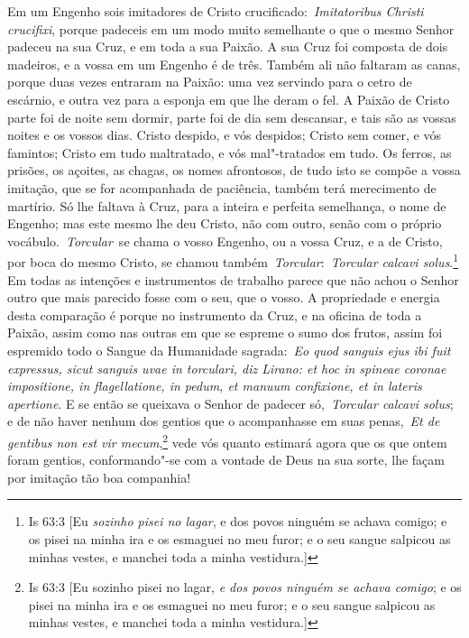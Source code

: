 Em um Engenho sois imitadores de Cristo
crucificado:~\emph{Imitatoribus Christi crucifixi}, porque padeceis em
um modo muito semelhante o que o mesmo Senhor padeceu na sua Cruz, e em
toda a sua Paixão. A sua Cruz foi composta de dois madeiros, e a vossa
em um Engenho é de três. Também ali não faltaram as canas, porque duas
vezes entraram na Paixão: uma vez servindo para o cetro de escárnio, e
outra vez para a esponja em que lhe deram o fel. A Paixão de Cristo
parte foi de noite sem dormir, parte foi de dia sem descansar, e tais
são as vossas noites e os vossos dias. Cristo despido, e vós despidos;
Cristo sem comer, e vós famintos; Cristo em tudo maltratado, e vós
mal"-tratados em tudo. Os ferros, as prisões, os açoites, as chagas, os
nomes afrontosos, de tudo isto se compõe a vossa imitação, que se for
acompanhada de paciência, também terá merecimento de martírio. Só lhe
faltava à Cruz, para a inteira e perfeita semelhança, o nome de Engenho;
mas este mesmo lhe deu Cristo, não com outro, senão com o próprio
vocábulo.~\emph{Torcular}~se chama o vosso Engenho, ou a vossa Cruz, e a
de Cristo, por boca do mesmo Cristo, se chamou
também~\emph{Torcular}:~\emph{Torcular calcavi solus}.\footnote{Is 63:3 [Eu \textit{sozinho pisei no lagar}, e dos povos ninguém se achava comigo; e os pisei na minha ira
e os esmaguei no meu furor; e o seu sangue salpicou as minhas vestes, e manchei toda a minha
vestidura.]}
Em todas as intenções e instrumentos de trabalho parece que não achou o
Senhor outro que mais parecido fosse com o seu, que o vosso. A
propriedade e energia desta comparação é porque no instrumento da Cruz,
e na oficina de toda a Paixão, assim como nas outras em que se espreme o
sumo dos frutos, assim foi espremido todo o Sangue da Humanidade
sagrada:~\emph{Eo quod sanguis ejus ibi fuit expressus, sicut sanguis
uvae in torculari, diz Lirano: et hoc in spineae coronae impositione, in
flagellatione, in pedum, et manuum confixione, et in lateris apertione}.
E se então se queixava o Senhor de padecer só,~\emph{Torcular calcavi
solus}; e de não haver nenhum dos gentios que o acompanhasse em suas
penas,~\emph{Et de gentibus non est vir mecum},\footnote{Is 63:3 [Eu sozinho pisei no lagar, \textit{e dos povos ninguém se achava comigo}; e os pisei na minha ira
e os esmaguei no meu furor; e o seu sangue salpicou as minhas vestes, e manchei toda a minha
vestidura.]} vede
vós quanto estimará agora que os que ontem foram gentios, conformando"-se
com a vontade de Deus na sua sorte, lhe façam por imitação tão boa
companhia!


